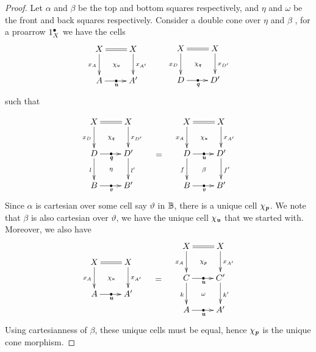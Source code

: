 \documentclass[9pt, leqno]{amsart}
\begin{document}
\begin{proof}
	Let $\alpha$ and $\beta$ be the top and bottom squares respectively, and $\eta$ and $\omega$ be the front and back squares respectively. Consider a double cone over $\eta$ and $\beta$ \ie, for a proarrow $1^{\bullet}_{X}$ we have the cells
	\begin{equation*}
		\vcenter{\vbox{\xymatrix{
					X \ar[d]_{x_A} \ar@{=}[r] \ar@{}[dr]|{\chi_{\mathbi{u}}} & X \ar[d]^{x_{A'}} \\					
					A \ar[r]|{\bullet}_{\mathbi{u}} & A'
		}}} \qquad
		\vcenter{\vbox{\xymatrix{
					X \ar[d]_{x_D} \ar@{=}[r] \ar@{}[dr]|{\chi_{\mathbi{q}}} & X \ar[d]^{x_{D'}} \\					
					D \ar[r]|{\bullet}_{\mathbi{q}} & D'
		}}}
	\end{equation*}
	such that 
	
	\begin{equation*}
		\vcenter{\vbox{\xymatrix{
					X \ar[d]_{x_{D}} \ar@{=}[r] \ar@{}[dr]|{\chi_{\mathbi{q}}} & X \ar[d]^{x_{D'}}	 \\
					D \ar[d]_{l} \ar[r]|{\bullet}_{\mathbi{q}} \ar@{}[dr]|{\eta} & D' \ar[d]^{l'} \\
					B \ar[r]|{\bullet}_{\mathbi{v}} & B'
		}}} \quad
		=
		\quad
		\vcenter{\vbox{\xymatrix{
					X \ar[d]_{x_{A}} \ar@{=}[r] \ar@{}[dr]|{\chi_{\mathbi{u}}} & X \ar[d]^{x_{A'}}	 \\
					D \ar[d]_{f} \ar[r]|{\bullet}_{\mathbi{u}} \ar@{}[dr]|{\beta} & D' \ar[d]^{f'} \\
					B \ar[r]|{\bullet}_{\mathbi{v}} & B'
		}}}
	\end{equation*}
	 Since $\alpha$ is cartesian over some cell say $\vartheta$ in $\mathbb{B}$, there is a unique cell $\chi_{\textbf{\em p}}$. We note that $\beta$ is also cartesian over $\vartheta$, we have the unique cell $\chi_{\textbf{\em u}}$ that we started with. Moreover, we also have 
	 \begin{equation*}
	 		\vcenter{\vbox{\xymatrix{
	 				X \ar[d]_{x_A} \ar@{=}[r] \ar@{}[dr]|{\chi_{\mathbi{u}}} & X \ar[d]^{x_{A'}} \\					
	 				A \ar[r]|{\bullet}_{\mathbi{u}} & A'		
	 		}}} \quad = \quad
 			\vcenter{\vbox{\xymatrix{
 					X \ar[d]_{x_{A}} \ar@{=}[r] \ar@{}[dr]|{\chi_{\mathbi{p}}} & X \ar[d]^{x_{A'}}	 \\
 					C \ar[d]_{k} \ar[r]|{\bullet}_{\mathbi{u}} \ar@{}[dr]|{\omega} & C' \ar[d]^{k'} \\
 					A \ar[r]|{\bullet}_{\mathbi{u}} & A'	
 			}}}
	 \end{equation*}
	Using cartesianness of $\beta$, these unique cells must be equal, hence $\chi_{\textbf{\em p}}$ is the unique cone morphism.
\end{proof}
\end{document}
